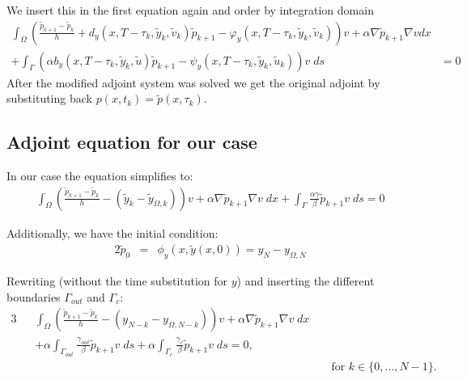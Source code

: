 \documentclass[
12pt, %
a4paper, %
onecolumn, %
portrait %
]{article}
\begin{document}
We insert this in the first equation again and order by integration domain
\begin{align*}
\int_{\Omega} (\frac{\tilde{p}_{k+1} - \tilde{p}_k}{h} + d_y(x,T - \tau_{k}, \tilde{y}_k, \tilde{v}_k) \tilde{p}_{k+1} - \varphi_y(x,T - \tau_k,\tilde{y}_k, \tilde{v}_k)) v + \alpha \nabla \tilde{p}_{k+1} \nabla v dx & \\
+ \int_{\Gamma} (\alpha b_y(x,T-\tau_k, \tilde{y}_k, \tilde{u}) \tilde{p}_{k+1} - \psi_y(x,T-\tau_k, \tilde{y}_k, \tilde{u}_k) ) v \; ds  & = 0
\end{align*}
After the modified adjoint system was solved we get the original adjoint by substituting back $p(x,t_k) = \tilde{p}(x,\tau_k)$.

\subsection{Adjoint equation for our case}
In our case the equation simplifies to:
\begin{align*}
\int_{\Omega} (\frac{\tilde{p}_{k+1} - \tilde{p}_k}{h} - (\tilde{y}_k - \tilde{y}_{\Omega,k})) v + \alpha \nabla \tilde{p}_{k+1} \nabla v \; dx 
+ \int_{\Gamma} \frac{\alpha \gamma}{\beta} \tilde{p}_{k+1} v \; ds  = 0
\end{align*}

Additionally, we have the initial condition:
\begin{alignat*}{2}
\tilde{p}_{0} &= &\phi_y(x, \tilde{y}(x,0)) = y_{N} - y_{\Omega, N}
\end{alignat*}

Rewriting (without the time substitution for $y$) and inserting the different boundaries $\Gamma_{out}$ and $\Gamma_c$:
\begin{alignat*}{3}
&&\int_{\Omega} (\frac{\tilde{p}_{k+1} - \tilde{p}_k}{h} - (y_{N-k} - y_{\Omega,N-k})) v + \alpha \nabla \tilde{p}_{k+1} \nabla v \; dx && \\
&&+ \alpha \int_{\Gamma_{out}} \frac{\gamma_{out}}{\beta} \tilde{p}_{k+1} v \; ds + \alpha \int_{\Gamma_{c}} \frac{\gamma_{c}}{\beta} \tilde{p}_{k+1} v \; ds  = 0, && \\
&& && \text{ for } k \in \{0, \hdots, N-1\}.
\end{alignat*}
\end{document}
